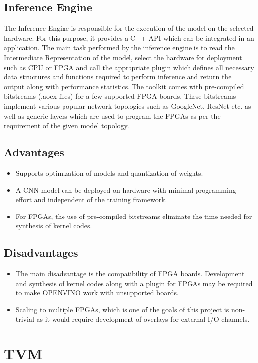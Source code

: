 \documentclass[titlepage]{report}
\begin{document}
 \subsection{Inference Engine}
 The Inference Engine is responsible for the execution of the model on the selected hardware. For this purpose, it provides a C++ API which can be integrated in an application. The main task performed by the inference engine is to read the Intermediate Representation of the model, select the hardware for deployment such as CPU or FPGA and call the appropriate plugin which defines all necessary data structures and functions required to perform inference and return the output along with performance statistics. 
 The toolkit comes with pre-compiled bitstreams (.aocx files) for a few supported FPGA boards. These bitstreams implement various popular network topologies such as GoogleNet, ResNet etc. as well as generic layers which are used to program the FPGAs as per the requirement of the given model topology. 
 \subsection{Advantages}
  
 \begin{itemize}
 \item Supports optimization of models and quantization of weights.
 \item A CNN model can be deployed on hardware with minimal programming effort and independent of the training framework.
 \item For FPGAs, the use of pre-compiled bitstreams eliminate the time needed for synthesis of kernel codes.
 \end{itemize}
 
 \subsection{Disadvantages}
 \begin{itemize}
 \item The main disadvantage is the compatibility of FPGA boards. Development and synthesis of kernel codes along with a plugin for FPGAs may be required to make OPENVINO work with unsupported boards. 
 \item Scaling to multiple FPGAs, which is one of the goals of this project is non-trivial as it would require development of overlays for external I/O channels. 
 \end{itemize}
\section{TVM}
\end{document}

